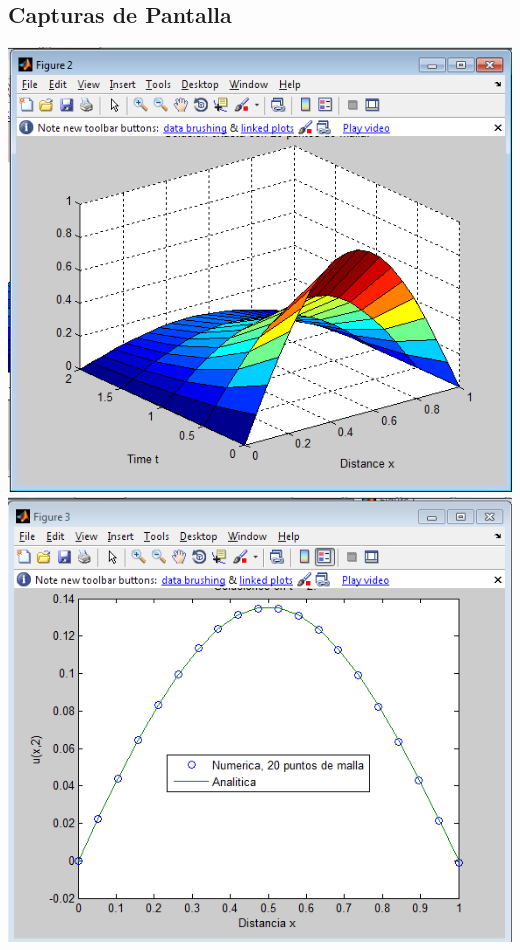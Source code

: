 \documentclass[10pt,a4paper]{article}
\begin{document}
\subsection{Capturas de Pantalla}
\includegraphics[scale=0.5]{Grafica1.png}\\
\includegraphics[scale=0.5]{Grafica2.png}
\end{document}
